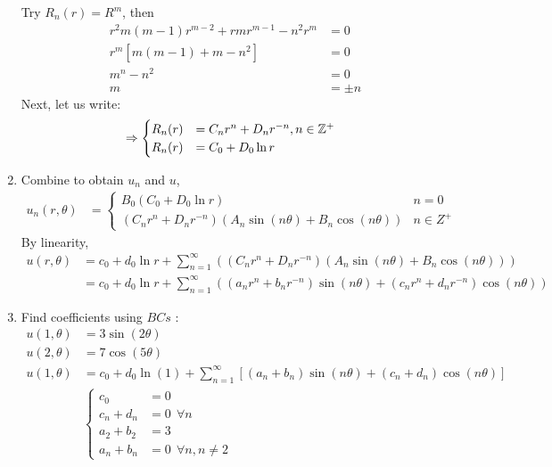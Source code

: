 \documentclass{article}
\begin{document}
\begin{enumerate}
  Try $R_n(r) = R^m$, then
  \begin{align}
    r^2 m( m - 1) r^{m - 2} + r mr^{m - 1} - n^2 r^m & = 0\\
    r^m \left[ m( m - 1) + m - n^2 \right] & = 0\\
    m^n - n^2 & = 0\\
    m & = \pm n
  \end{align}
  Next, let us write:
  \begin{align}
    & \Rightarrow
    \begin{cases}
      R_n(r) & = C_n r^n + D_n r^{-n}, n \in \mathbb Z^+\\
      R_n(r) & = C_0 + D_0 \ln r
    \end{cases}
  \end{align}
  \item Combine to obtain $u_n$ and $u$,
  \begin{align}
    u_n(r, \theta) & =
    \begin{cases}
      B_0(C_0 + D_0 \ln r) & n = 0\\
      (C_n r^n + D_n r^{-n})(A_n \sin(n \theta) + B_n \cos(n \theta)) & n \in Z^+
    \end{cases}
  \end{align}
  By linearity,
  \begin{align}
    u(r, \theta) & =
    c_0 + d_0 \ln r + \sum^\infty_{n = 1}
    \left(
    (C_n r^n + D_n r^{-n})(A_n \sin(n \theta) + B_n \cos(n \theta))
    \right)\\
    & =
    c_0 + d_0 \ln r + \sum^\infty_{n = 1}
    \left(
    (a_n r^n + b_n r^{-n})\sin(n \theta) + (c_n r^n + d_n r^{-n}) \cos(n \theta)
    \right)
  \end{align}
  \item Find coefficients using $BCs$ :
  \begin{align}
    u(1, \theta) & = 3 \sin(2 \theta)\\
    u(2, \theta) & = 7 \cos(5 \theta)\\
    u(1, \theta) & = c_0 + d_0 \ln(1) + \sum^\infty_{n = 1}
    \left[
    (a_n + b_n) \sin(n \theta) +
    (c_n + d_n) \cos(n \theta)
    \right]\\
    &
    \begin{cases}
      c_0       & = 0\ \           \\
      c_n + d_n & = 0\ \ \forall n \\
      a_2 + b_2 & = 3\ \           \\
      a_n + b_n & = 0\ \ \forall n, n \neq 2

\end{cases}
\end{align}
\end{enumerate}
\end{document}
